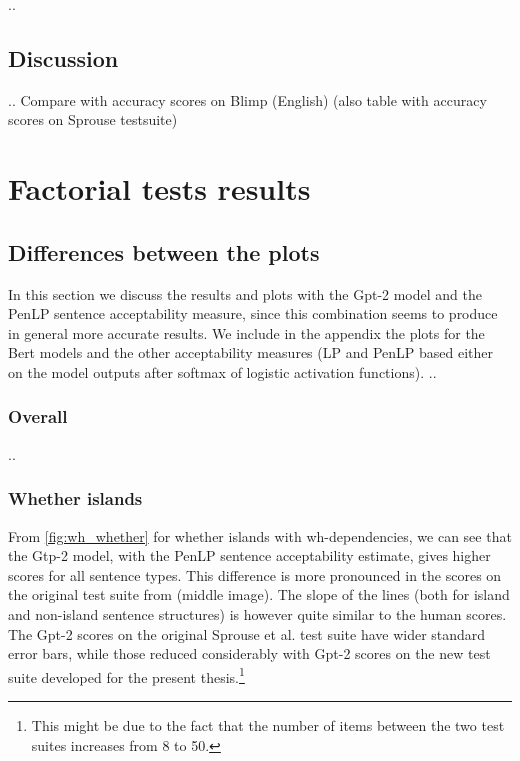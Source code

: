 ..
\subsection{Discussion}
..
Compare with accuracy scores on Blimp (English)
(also table with accuracy scores on Sprouse testsuite)


\section{Factorial tests results}



\subsection{Differences between the plots}

In this section we discuss the results and plots with the Gpt-2 model and the PenLP sentence acceptability measure, since this combination seems to produce in general more accurate results. We include in the appendix the plots for the Bert models and the other acceptability measures (LP and PenLP based either on the model outputs after softmax of logistic activation functions).
..

\subsubsection{Overall}
..

\subsubsection{Whether islands}

From \autoref{fig:wh_whether} for whether islands with wh-dependencies, we can see that the Gtp-2 model, with the PenLP sentence acceptability estimate, gives higher scores for all sentence types. This difference is more pronounced in the scores on the original test suite from \citet{sprouse2016experimental} (middle image). The slope of the lines (both for island and non-island sentence structures) is however quite similar to the human scores. The Gpt-2 scores on the original Sprouse et al. test suite have wider standard error bars, while those reduced considerably with Gpt-2 scores on the new test suite developed for the present thesis.\footnote{This might be due to the fact that the number of items between the two test suites increases from 8 to 50.}

